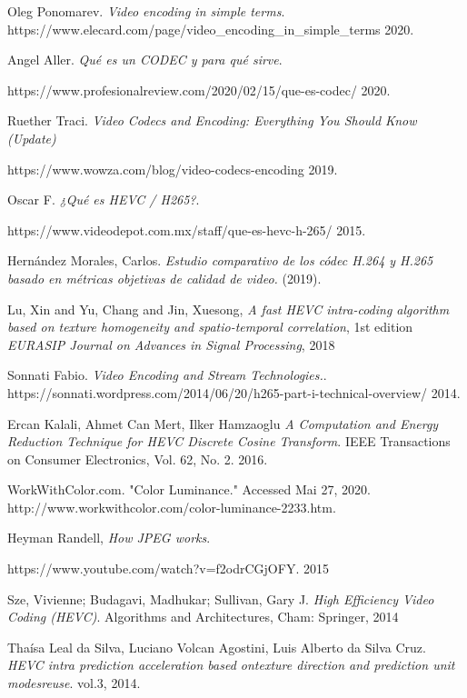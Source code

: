 \documentclass[10pt,journal,compsoc]{IEEEtran}
\begin{document}
\begin{thebibliography}{9}

Oleg Ponomarev. 
\textit{Video encoding in simple terms}. 
https://www.elecard.com/page/video\_encoding\_in\_simple\_terms 2020.


Angel Aller. 
\textit{Qué es un CODEC y para qué sirve}. 

https://www.profesionalreview.com/2020/02/15/que-es-codec/ 2020.


Ruether Traci. 
\textit{Video Codecs and Encoding: Everything You Should Know (Update)}
   
https://www.wowza.com/blog/video-codecs-encoding 2019.

Oscar F. 
\textit{¿Qué es HEVC / H265?}. 

https://www.videodepot.com.mx/staff/que-es-hevc-h-265/ 2015.


Hernández Morales, Carlos. 
\textit{Estudio comparativo de los códec H.264 y H.265 basado en métricas objetivas de calidad de video.} (2019).



Lu, Xin and Yu, Chang and Jin, Xuesong,
\textit{A fast HEVC intra-coding algorithm based on texture homogeneity and spatio-temporal correlation},
1st edition
\textit {EURASIP Journal on Advances in Signal Processing},
2018

Sonnati Fabio.  
\textit{Video Encoding and Stream Technologies.}. 
https://sonnati.wordpress.com/2014/06/20/h265-part-i-technical-overview/ 2014.

Ercan Kalali, Ahmet Can Mert, Ilker Hamzaoglu
\textit{A Computation and Energy Reduction Technique for HEVC Discrete Cosine Transform}. IEEE Transactions on Consumer Electronics, Vol. 62, No. 2. 2016.


WorkWithColor.com. "Color Luminance." Accessed Mai 27, 2020. http://www.workwithcolor.com/color-luminance-2233.htm.


Heyman Randell,
\textit{How JPEG works}.

https://www.youtube.com/watch?v=f2odrCGjOFY. 2015


Sze, Vivienne; Budagavi, Madhukar; Sullivan, Gary J.
\textit{High Efficiency Video Coding (HEVC)}. Algorithms and Architectures, Cham: Springer, 2014


Thaísa Leal da Silva, Luciano Volcan Agostini, Luis Alberto da Silva Cruz.
\textit{HEVC intra prediction acceleration based ontexture direction and prediction unit modesreuse}. vol.3, 2014.



\end{thebibliography}
\end{document}
